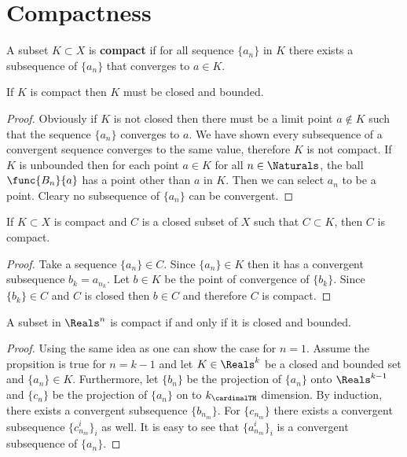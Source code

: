 \section{Compactness}
A subset \(K \subset X\) is \textbf{compact} if for all sequence \(\{a_n\}\) in \(K\) there exists a subsequence of \(\{a_n\}\) that converges to \(a \in K\).

\begin{corollary}
    If \(K\) is compact then \(K\) must be closed and bounded.
\end{corollary}

\begin{proof}
    Obviously if \(K\) is not closed then there must be a limit point \(a \notin K\) such that the sequence \(\{a_n\}\) converges to \(a\). We have shown every subsequence of a convergent sequence converges to the same value, therefore \(K\) is not compact.
    If \(K\) is unbounded then for each point \(a \in K\) for all \(n \in \Naturals\), the ball \(\func{B_n}{a}\) has a point other than \(a\) in \(K\). Then we can select \(a_n\) to be a point. Cleary no subsequence of \(\{a_n\}\) can be convergent.
\end{proof}

\begin{theorem}
    If \(K \subset X\) is compact and \(C\) is a closed subset of \(X\) such that \(C \subset K\), then \(C\) is compact.
\end{theorem}

\begin{proof}
    Take a sequence \(\{a_n\} \in C\). Since \(\{a_n\} \in K\) then it has a convergent subsequence \(b_k = a_{n_k}\). Let \(b \in K\) be the point of convergence of \(\{b_k\}\). Since \(\{b_k\} \in C\) and \(C\) is closed then \(b \in C\) and therefore \(C\) is compact.
\end{proof}

\begin{proposition}
    A subset in \(\Reals^n\) is compact if and only if it is closed and bounded.
\end{proposition}

\begin{proof}
    Using the same idea as  one can show the case for \(n = 1\). Assume the propsition is true for \(n = k - 1\) and let \(K \in \Reals^k\) be a closed and bounded set and \(\{a_n\} \in K\). Furthermore, let \(\{b_n\}\) be the projection of \(\{a_n\}\) onto \(\Reals^{k-1}\) and \(\{c_n\}\) be the projection of \(\{a_n\}\) on to \(k_{\cardinalTH}\) dimension. By induction, there exists a convergent subsequence \(\{b_{n_m}\}\). For \(\{c_{n_m}\}\) there exists a convergent subsequence \(\{c_{n_m}^i\}_i\) as well. It is easy to see that \(\{ a_{n_m}^i\}_i \) is a convergent subsequence of \(\{a_n\}\).
\end{proof}

